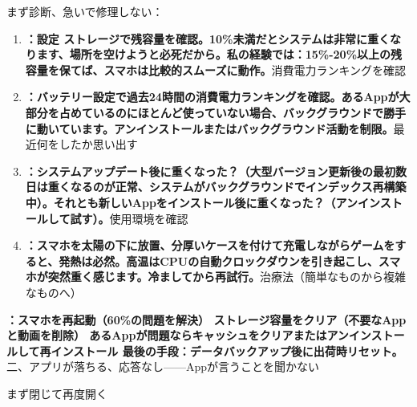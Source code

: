 


まず診断、急いで修理しない：


\begin{enumerate}
  \item \textbf{：設定 ストレージで残容量を確認。10\%未満だとシステムは非常に重くなります、場所を空けようと必死だから。私の経験では：15\%-20\%以上の残容量を保てば、スマホは比較的スムーズに動作。}消費電力ランキングを確認
  \item \textbf{：バッテリー設定で過去24時間の消費電力ランキングを確認。あるAppが大部分を占めているのにほとんど使っていない場合、バックグラウンドで勝手に動いています。アンインストールまたはバックグラウンド活動を制限。}最近何をしたか思い出す
  \item \textbf{：システムアップデート後に重くなった？（大型バージョン更新後の最初数日は重くなるのが正常、システムがバックグラウンドでインデックス再構築中）。それとも新しいAppをインストール後に重くなった？（アンインストールして試す）。}使用環境を確認
  \item \textbf{：スマホを太陽の下に放置、分厚いケースを付けて充電しながらゲームをすると、発熱は必然。高温はCPUの自動クロックダウンを引き起こし、スマホが突然重く感じます。冷ましてから再試行。}治療法（簡単なものから複雑なものへ）
\end{enumerate}

\textbf{：スマホを再起動（60\%の問題を解決） ストレージ容量をクリア（不要なAppと動画を削除） あるAppが問題ならキャッシュをクリアまたはアンインストールして再インストール 最後の手段：データバックアップ後に出荷時リセット。}二、アプリが落ちる、応答なし——Appが言うことを聞かない


まず閉じて再度開く

